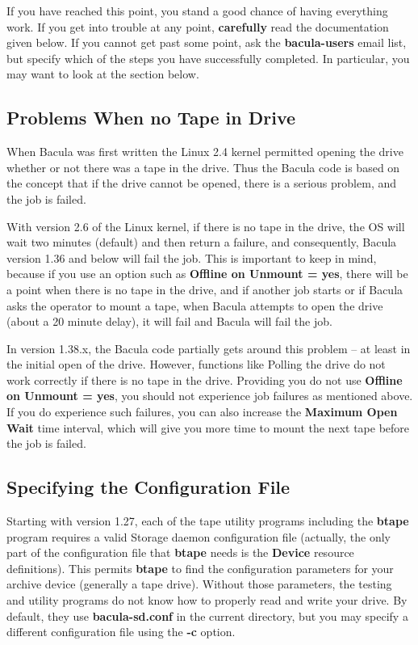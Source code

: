 If you have reached this point, you stand a good chance of having everything
work. If you get into trouble at any point, {\bf carefully} read the
documentation given below. If you cannot get past some point, ask the {\bf
bacula-users} email list, but specify which of the steps you have successfully
completed. In particular, you may want to look at the
 section below.


\label{NoTapeInDrive}
\subsection{Problems When no Tape in Drive}
When Bacula was first written the Linux 2.4 kernel permitted opening the
drive whether or not there was a tape in the drive. Thus the Bacula code is
based on the concept that if the drive cannot be opened, there is a serious
problem, and the job is failed.

With version 2.6 of the Linux kernel, if there is no tape in the drive, the
OS will wait two minutes (default) and then return a failure, and consequently,
Bacula version 1.36 and below will fail the job.  This is important to keep
in mind, because if you use an option such as {\bf Offline on Unmount =
yes}, there will be a point when there is no tape in the drive, and if
another job starts or if Bacula asks the operator to mount a tape, when
Bacula attempts to open the drive (about a 20 minute delay), it will fail
and Bacula will fail the job.

In version 1.38.x, the Bacula code partially gets around this problem -- at
least in the initial open of the drive.  However, functions like Polling
the drive do not work correctly if there is no tape in the drive.
Providing you do not use {\bf Offline on Unmount = yes}, you should not
experience job failures as mentioned above.  If you do experience such
failures, you can also increase the {\bf Maximum Open Wait} time interval,
which will give you more time to mount the next tape before the job is
failed.

\subsection{Specifying the Configuration File}

Starting with version 1.27, each of the tape utility programs including the
{\bf btape} program requires a valid Storage daemon configuration file
(actually, the only part of the configuration file that {\bf btape} needs is
the {\bf Device} resource definitions). This permits {\bf btape} to find the
configuration parameters for your archive device (generally a tape drive).
Without those parameters, the testing and utility programs do not know how to
properly read and write your drive. By default, they use {\bf bacula-sd.conf}
in the current directory, but you may specify a different configuration file
using the {\bf -c} option.

